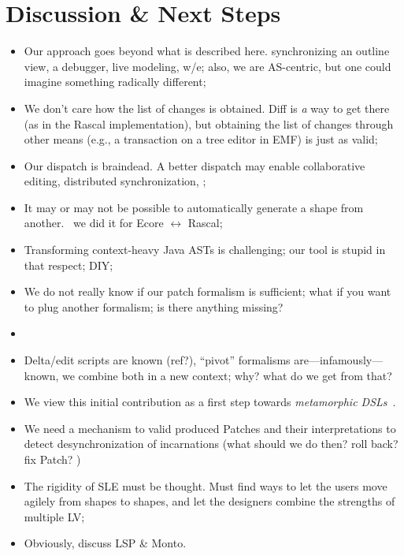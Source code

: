 \section{Discussion \& Next Steps}
\label{sec:discussion}
\begin{itemize}
	\item Our approach goes beyond what is described here. \eg synchronizing an outline view, a debugger, live modeling, w/e; also, we are AS-centric, but one could imagine something radically different;
	\item We don’t care how the list of changes is obtained. Diff is \emph{a} way to get there (as in the Rascal implementation), but obtaining the list of changes through other means (e.g., a transaction on a tree editor in EMF) is just as valid;
	\item Our dispatch is braindead. A better dispatch may enable collaborative editing, distributed synchronization, \etc;
	\item It may or may not be possible to automatically generate a shape from another. \eg~we did it for Ecore $\leftrightarrow$ Rascal;
	\item Transforming context-heavy Java ASTs is challenging; our tool is stupid in that respect; DIY;
	\item We do not really know if our patch formalism is sufficient; what if you want to plug another formalism; is there anything missing?
	\item \cite{lammel2005mappings}
	\item Delta/edit scripts are known (ref?), ``pivot'' formalisms are---infamously---known, we combine both in a new context; why? what do we get from that?
	\item We view this initial contribution as a first step towards \emph{metamorphic DSLs}~\cite{acher2014metamorphic}.
	\item We need a mechanism to valid produced Patches and their interpretations to detect desynchronization of incarnations (what should we do then? roll back? fix Patch? )
    \item The rigidity of SLE must be thought. Must find ways to let the users move agilely from shapes to shapes, and let the designers combine the strengths of multiple LV;
    \item Obviously, discuss LSP \& Monto.
\end{itemize}
